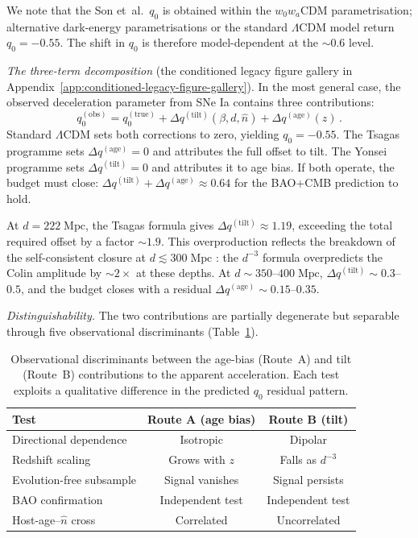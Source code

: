 We note that the Son et~al.\ $q_0$ is obtained within the
$w_0w_a$CDM parametrisation; alternative dark-energy
parametrisations or the standard $\Lambda$CDM model return
$q_0 = -0.55$.  The shift in $q_0$ is therefore
model-dependent at the $\sim\!0.6$ level.

\emph{The three-term decomposition}
(the conditioned legacy figure gallery in Appendix~\ref{app:conditioned-legacy-figure-gallery}).
In the most general case, the observed deceleration parameter
from SNe Ia contains three contributions:
\begin{equation}\label{eq:disc-q-decomp}
q_0^{(\mathrm{obs})}
= q_0^{(\mathrm{true})}
  + \Delta q^{(\mathrm{tilt})}(\beta, d, \hat{n})
  + \Delta q^{(\mathrm{age})}(z)\,.
\end{equation}
Standard $\Lambda$CDM sets both corrections to zero, yielding
$q_0 = -0.55$.  The Tsagas programme sets
$\Delta q^{(\mathrm{age})} = 0$ and attributes the full offset to
tilt.  The Yonsei programme sets
$\Delta q^{(\mathrm{tilt})} = 0$ and attributes it to age bias.
If both operate, the budget must close:
$\Delta q^{(\mathrm{tilt})} + \Delta q^{(\mathrm{age})}
\approx 0.64$ for the BAO+CMB prediction to hold.

At $d = 222\;\mathrm{Mpc}$, the Tsagas formula gives
$\Delta q^{(\mathrm{tilt})} \approx 1.19$, exceeding the total
required offset by a factor $\sim\!1.9$.  This overproduction
reflects the breakdown of the self-consistent closure at
$d \lesssim 300\;\mathrm{Mpc}$ :
the $d^{-3}$ formula overpredicts the Colin amplitude by
$\sim\!2\times$ at these depths.  At $d \sim 350$--$400\;
\mathrm{Mpc}$, $\Delta q^{(\mathrm{tilt})} \sim 0.3$--$0.5$,
and the budget closes with a residual
$\Delta q^{(\mathrm{age})} \sim 0.15$--$0.35$.

\emph{Distinguishability.}
The two contributions are partially degenerate but
separable through five observational discriminants
(Table~\ref{tab:disc-discriminants}).

\begin{table}[t]
\centering
\footnotesize
\setlength{\tabcolsep}{3pt}
\caption{Observational discriminants between the age-bias
(Route~A) and tilt (Route~B) contributions to the apparent
acceleration.  Each test exploits a qualitative difference in the
predicted $q_0$ residual pattern.}
\label{tab:disc-discriminants}
\begin{tabular}{lcc}
\toprule
Test & Route A (age bias) & Route B (tilt) \\
\midrule
Directional dependence & Isotropic & Dipolar \\
Redshift scaling & Grows with $z$ & Falls as $d^{-3}$ \\
Evolution-free subsample & Signal vanishes & Signal persists \\
BAO confirmation & Independent test & Independent test \\
Host-age--$\hat{n}$ cross & Correlated & Uncorrelated \\
\bottomrule
\end{tabular}
\end{table}

